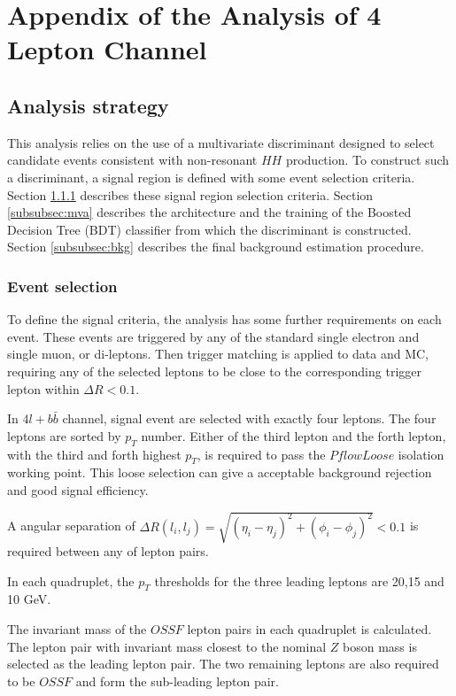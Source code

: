 \section{Appendix of the Analysis of 4 Lepton Channel }
\label{sec:AppAnaFourL}

\subsection{Analysis strategy}
\label{subsec:ana}

This analysis relies on the use of a multivariate discriminant designed to select candidate events consistent with non-resonant $HH$ production. To construct such a discriminant, a signal region is defined with some event selection criteria. Section \ref{subsubsec:pre-selection} describes these signal region selection criteria. Section \ref{subsubsec:mva} describes the architecture and the training of the Boosted Decision Tree (BDT) classifier from which the discriminant is constructed. Section \ref{subsubsec:bkg} describes the final background estimation procedure.

\subsubsection{Event selection}
\label{subsubsec:pre-selection}

To define the signal criteria, the analysis has some further requirements on each event. These events are triggered by any of the standard single electron and single muon, or di-leptons. Then trigger matching is applied to data and MC, requiring any of the selected leptons to be close to the corresponding trigger lepton within $\Delta{R}<0.1$.

In $4l+b\bar{b}$ channel, signal event are selected with exactly four leptons. The four leptons are sorted by $p_{T}$ number. Either of the third lepton and the forth lepton, with the third and forth highest $p_{T}$, is required to pass the $PflowLoose$ isolation working point. This loose selection can give a acceptable background rejection and good signal efficiency.

A angular separation of $\Delta{R}(l_{i},l_{j})=\sqrt{(\eta_{i}-\eta_{j})^{2}+(\phi_{i}-\phi_{j})^{2}}<0.1$ is required between any of lepton pairs.

In each quadruplet, the $p_{T}$ thresholds for the three leading leptons are 20,15 and 10 GeV.

The invariant mass of the $OSSF$ lepton pairs in each quadruplet is calculated. The lepton pair with invariant mass closest to the nominal $Z$ boson mass is selected as the leading lepton pair. The two remaining leptons are also required to be $OSSF$ and form the sub-leading lepton pair.

